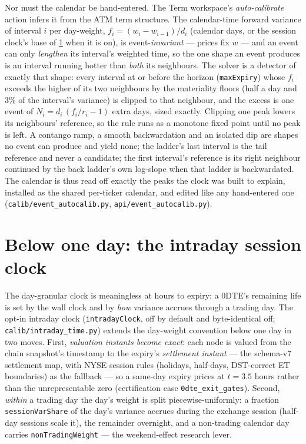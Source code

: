 \documentclass[11pt]{article}
\begin{document}
Nor must the calendar be hand-entered. The Term workspace's
\emph{auto-calibrate} action infers it from the ATM term structure. The
calendar-time forward variance of interval $i$ per day-weight,
$f_i=(w_i-w_{i-1})/d_i$ (calendar days, or the session clock's base of
\cref{sec:intraday} when it is on), is event-\emph{invariant} --- prices fix
$w$ --- and an event can only \emph{lengthen} its interval's weighted time,
so the one shape an event produces is an interval running hotter than
\emph{both} its neighbours. The solver is a detector of exactly that shape:
every interval at or before the horizon (\texttt{maxExpiry}) whose $f_i$
exceeds the higher of its two neighbours by the materiality floors (half a
day and $3\%$ of the interval's variance) is clipped to that neighbour, and
the excess is one event of $N_i=d_i\,(f_i/r_i-1)$ extra days, sized exactly.
Clipping one peak lowers its neighbours' reference, so the rule runs as a
monotone fixed point until no peak is left. A contango ramp, a smooth
backwardation and an isolated dip are shapes no event can produce and yield
none; the ladder's last interval is the tail reference and never a candidate;
the first interval's reference is its right neighbour continued by the back
ladder's own log-slope when that ladder is backwardated. The calendar is thus
read off exactly the peaks the clock was built to explain, installed as the
shared per-ticker calendar, and edited like any hand-entered one
(\nolinkurl{calib/event_autocalib.py}, \nolinkurl{api/event_autocalib.py}).

\section{Below one day: the intraday session clock}
\label{sec:intraday}

The day-granular clock is meaningless at hours to expiry: a 0DTE's remaining
life is set by the wall clock and by \emph{how} variance accrues through a
trading day. The opt-in intraday clock (\texttt{intradayClock}, off by
default and byte-identical off; \nolinkurl{calib/intraday_time.py}) extends
the day-weight convention below one day in two moves. First, \emph{valuation
instants become exact}: each node is valued from the chain snapshot's
timestamp to the expiry's \emph{settlement instant} --- the schema-v7
settlement map, with NYSE session rules (holidays, half-days, DST-correct ET
boundaries) as the fallback --- so a same-day expiry prices at $t=3.5$ hours
rather than the unrepresentable zero (certification case
\texttt{0dte\_exit\_gates}). Second, \emph{within} a trading day the day's
weight is split piecewise-uniformly: a fraction \texttt{sessionVarShare} of
the day's variance accrues during the exchange session (half-day sessions
scale it), the remainder overnight, and a non-trading calendar day carries
\texttt{nonTradingWeight} --- the weekend-effect research lever.
\end{document}
